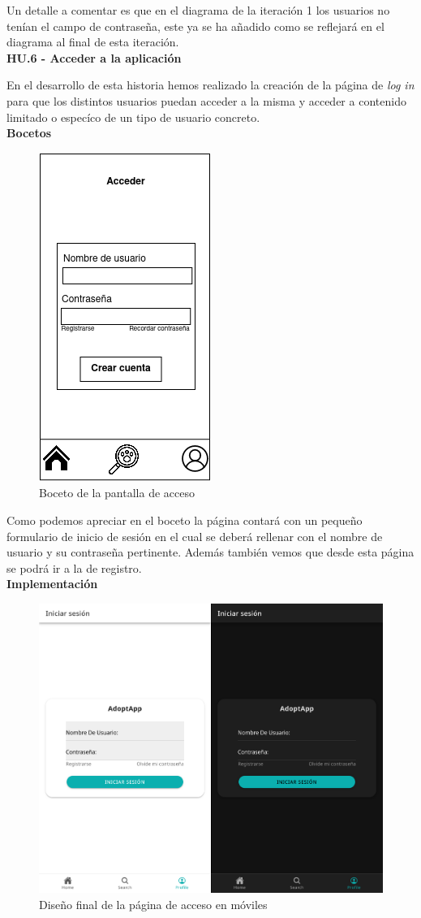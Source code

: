 Un detalle a comentar es que en el diagrama de la iteración 1 los usuarios no tenían el campo de contraseña, este ya se ha añadido como se reflejará en el diagrama al final de esta iteración. \\


\Large{\textbf{HU.6 - Acceder a la aplicación}} 

En el desarrollo de esta historia hemos realizado la creación de la página de \textit{log in} para que los distintos usuarios puedan acceder a la misma y acceder a contenido limitado o especíco de un tipo de usuario concreto. \\ 

\textbf{Bocetos}


\begin{figure}[H]
	\centering
	\includegraphics[width=0.31\linewidth]{"sprint 2/hu6/login"}
	\caption{Boceto de la pantalla de acceso}
	\label{fig:login}
\end{figure}

Como podemos apreciar en el boceto la página contará con un pequeño formulario de inicio de sesión en el cual se deberá rellenar con el nombre de usuario y su contraseña pertinente. Además también vemos que desde esta página se podrá ir a la de registro. \\

\textbf{Implementación}

\begin{figure}[H]
	\centering
	\includegraphics[width=0.7\linewidth]{"sprint 2/hu6/ImpLoginMovil"}
	\caption{Diseño final de la página de acceso en móviles}
	\label{fig:imploginmovil}
\end{figure}

